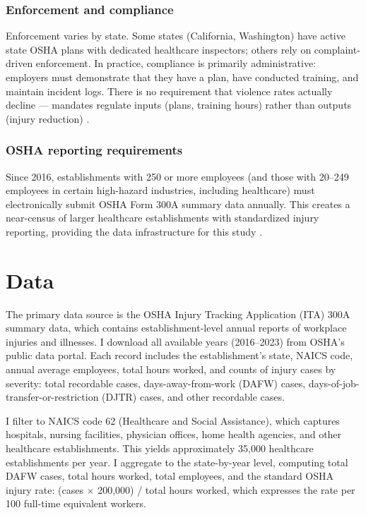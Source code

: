 \documentclass[12pt]{article}
\begin{document}
\subsubsection*{Enforcement and compliance} Enforcement varies by state. Some states (California, Washington) have active state OSHA plans with dedicated healthcare inspectors; others rely on complaint-driven enforcement. In practice, compliance is primarily administrative: employers must demonstrate that they have a plan, have conducted training, and maintain incident logs. There is no requirement that violence rates actually decline --- mandates regulate inputs (plans, training hours) rather than outputs (injury reduction) \citep{healthaffairs2024}.

\subsubsection*{OSHA reporting requirements} Since 2016, establishments with 250 or more employees (and those with 20--249 employees in certain high-hazard industries, including healthcare) must electronically submit OSHA Form 300A summary data annually. This creates a near-census of larger healthcare establishments with standardized injury reporting, providing the data infrastructure for this study \citep{osha_ita2024}.

\section{Data}

The primary data source is the OSHA Injury Tracking Application (ITA) 300A summary data, which contains establishment-level annual reports of workplace injuries and illnesses. I download all available years (2016--2023) from OSHA's public data portal. Each record includes the establishment's state, NAICS code, annual average employees, total hours worked, and counts of injury cases by severity: total recordable cases, days-away-from-work (DAFW) cases, days-of-job-transfer-or-restriction (DJTR) cases, and other recordable cases.

I filter to NAICS code 62 (Healthcare and Social Assistance), which captures hospitals, nursing facilities, physician offices, home health agencies, and other healthcare establishments. This yields approximately 35,000 healthcare establishments per year. I aggregate to the state-by-year level, computing total DAFW cases, total hours worked, total employees, and the standard OSHA injury rate: (cases $\times$ 200,000) / total hours worked, which expresses the rate per 100 full-time equivalent workers.
\end{document}
